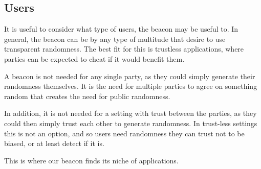 \subsection{Users}
It is useful to consider what type of users, the beacon may be useful to. In general, the beacon can be by any type of multitude that desire to use transparent randomness. The best fit for this is trustless applications, where parties can be expected to cheat if it would benefit them.

A beacon is not needed for any single party, as they could simply generate their randomness themselves. It is the need for multiple parties to agree on something random that creates the need for public randomness.

In addition, it is not needed for a setting with trust between the parties, as they could then simply trust each other to generate randomness. In trust-less settings this is not an option, and so users need randomness they can trust not to be biased, or at least detect if it is.

This is where our beacon finds its niche of applications.